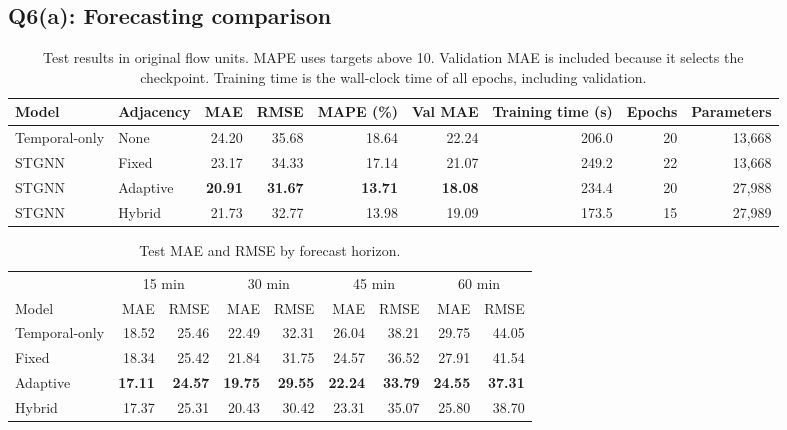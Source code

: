 \documentclass{article}
\begin{document}
\subsection*{Q6(a): Forecasting comparison}

\begin{table}[htbp]
\centering
\caption{Test results in original flow units. MAPE uses targets above 10. Validation MAE is included because it selects the checkpoint. Training time is the wall-clock time of all epochs, including validation.}
\label{tab:results}
\footnotesize
\begin{adjustbox}{max width=\linewidth}
\begin{tabular}{llrrrrrrr}
\toprule
Model & Adjacency & MAE & RMSE & MAPE (\%) & Val MAE & Training time (s) & Epochs & Parameters \\
\midrule
Temporal-only & None & 24.20 & 35.68 & 18.64 & 22.24 & 206.0 & 20 & 13,668 \\
STGNN & Fixed & 23.17 & 34.33 & 17.14 & 21.07 & 249.2 & 22 & 13,668 \\
STGNN & Adaptive & \textbf{20.91} & \textbf{31.67} & \textbf{13.71} & \textbf{18.08} & 234.4 & 20 & 27,988 \\
STGNN & Hybrid & 21.73 & 32.77 & 13.98 & 19.09 & 173.5 & 15 & 27,989 \\
\bottomrule
\end{tabular}
\end{adjustbox}
\end{table}

\begin{table}[htbp]
\centering
\caption{Test MAE and RMSE by forecast horizon.}
\label{tab:horizon}
\footnotesize
\begin{tabular}{lrrrrrrrr}
\toprule
 & \multicolumn{2}{c}{15 min} & \multicolumn{2}{c}{30 min} & \multicolumn{2}{c}{45 min} & \multicolumn{2}{c}{60 min} \\
\cmidrule(lr){2-3}\cmidrule(lr){4-5}\cmidrule(lr){6-7}\cmidrule(lr){8-9}
Model & MAE & RMSE & MAE & RMSE & MAE & RMSE & MAE & RMSE \\
\midrule
Temporal-only & 18.52 & 25.46 & 22.49 & 32.31 & 26.04 & 38.21 & 29.75 & 44.05 \\
Fixed & 18.34 & 25.42 & 21.84 & 31.75 & 24.57 & 36.52 & 27.91 & 41.54 \\
Adaptive & \textbf{17.11} & \textbf{24.57} & \textbf{19.75} & \textbf{29.55} & \textbf{22.24} & \textbf{33.79} & \textbf{24.55} & \textbf{37.31} \\
Hybrid & 17.37 & 25.31 & 20.43 & 30.42 & 23.31 & 35.07 & 25.80 & 38.70 \\
\bottomrule
\end{tabular}
\end{table}
\end{document}
